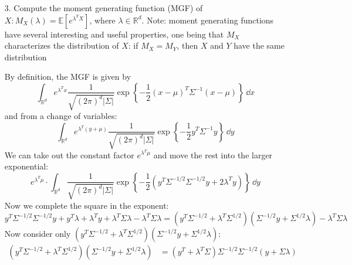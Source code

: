\documentclass{article}
\begin{document}
\begin{itemize}
            \item [3.] Compute the moment generating function (MGF) of $X: M_{X}(\lambda) = \mathbb{E}[e^{\lambda^{T}X}]$, where $\lambda \in \mathbb{R}^{d}$. Note: moment generating functions have several interesting and useful properties, one being that $M_{X}$ characterizes the distribution of $X$: if $M_{X} = M_{Y}$, then $X$ and $Y$ have the same distribution
                \begin{answer}
                    By definition, the MGF is given by
                        \begin{equation*}
                            \int_{\mathbb{R}^{d}}^{} e^{\lambda^{T}x}\dfrac{1}{\sqrt{(2\pi)^{d}\lvert \Sigma \rvert}}\exp\left\{-\dfrac{1}{2}(x - \mu)^{T}\Sigma^{-1}(x - \mu)\right\} \, \dd{x} 
                        \end{equation*}
                    and from a change of variables:
                        \begin{equation*}
                            \int_{\mathbb{R}^{d}}^{} e^{\lambda^{T}(y + \mu)}\dfrac{1}{\sqrt{(2\pi)^{d}\lvert \Sigma \rvert}}\exp\left\{-\dfrac{1}{2}y^{T} \Sigma^{-1} y\right\} \, \dd{y} 
                        \end{equation*}
                    We can take out the constant factor $e^{\lambda^{T}\mu}$ and move the rest into the larger exponential:
                        \begin{equation*}
                            e^{\lambda^{T}\mu} \cdot \int_{\mathbb{R}^{d}}^{} \dfrac{1}{\sqrt{(2\pi)^{d}\lvert \Sigma \rvert}}\exp\left\{-\dfrac{1}{2}(y^{T}\Sigma^{-1/2}\Sigma^{-1/2}y + 2\lambda^{T}y)\right\} \, \dd{y} 
                        \end{equation*}
                    Now we complete the square in the exponent:
                        \begin{equation*}
                            y^{T}\Sigma^{-1/2}\Sigma^{-1/2}y + y^{T}\lambda + \lambda^{T}y + \lambda^{T}\Sigma\lambda - \lambda^{T}\Sigma\lambda = (y^{T}\Sigma^{-1/2} + \lambda^{T}\Sigma^{1/2})(\Sigma^{-1/2}y + \Sigma^{1/2}\lambda) - \lambda^{T}\Sigma\lambda
                        \end{equation*}
                    Now consider only $(y^{T}\Sigma^{-1/2} + \lambda^{T}\Sigma^{1/2})(\Sigma^{-1/2}y + \Sigma^{1/2}\lambda)$:
                        \begin{align*}
                            (y^{T}\Sigma^{-1/2} + \lambda^{T}\Sigma^{1/2})(\Sigma^{-1/2}y + \Sigma^{1/2}\lambda) &= (y^{T} + \lambda^{T}\Sigma)\Sigma^{-1/2} \Sigma^{-1/2}(y + \Sigma\lambda) \\

\end{align*}
\end{answer}
\end{itemize}
\end{document}

